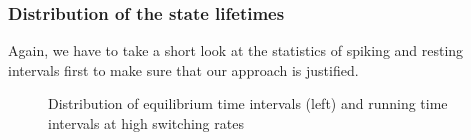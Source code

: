 \documentclass[12pt,a4paper]{article}
\begin{document}
\subsubsection{Distribution of the state lifetimes}
Again, we have to take a short look at the statistics of spiking and resting intervals first to make sure that our approach is justified.
\begin{figure}[H]
	\hspace*{-0.5cm}
	\caption{Distribution of equilibrium time intervals (left) and running time intervals at high switching rates}
	\label{intdistanhopf}
\end{figure}
\end{document}
